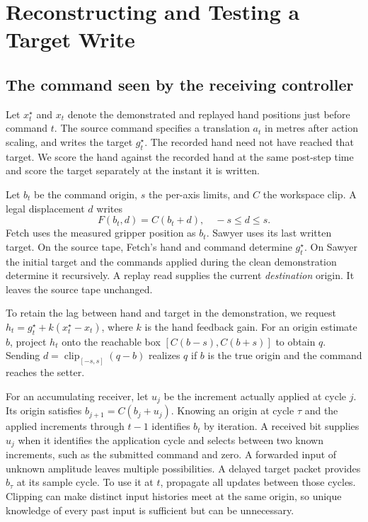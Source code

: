 \section{Reconstructing and Testing a Target Write}
\subsection{The command seen by the receiving controller}
Let $x_t^\star$ and $x_t$ denote the demonstrated and replayed hand positions just before command $t$. The source command specifies a translation $a_t$ in metres after action scaling, and writes the target $g_t^\star$. The recorded hand need not have reached that target. We score the hand against the recorded hand at the same post-step time and score the target separately at the instant it is written.

Let $b_t$ be the command origin, $s$ the per-axis limits, and $C$ the workspace clip. A legal displacement $d$ writes
\begin{equation}
 F(b_t,d)=C(b_t+d),\quad -s\le d\le s .\label{eq:setter}
\end{equation}
Fetch uses the measured gripper position as $b_t$. Sawyer uses its last written target. On the source tape, Fetch's hand and command determine $g_t^\star$. On Sawyer the initial target and the commands applied during the clean demonstration determine it recursively. A replay read supplies the current \emph{destination} origin. It leaves the source tape unchanged.

To retain the lag between hand and target in the demonstration, we request $h_t=g_t^\star+k(x_t^\star-x_t)$, where $k$ is the hand feedback gain. For an origin estimate $b$, project $h_t$ onto the reachable box $[C(b-s),C(b+s)]$ to obtain $q$. Sending $d=\operatorname{clip}_{[-s,s]}(q-b)$ realizes $q$ if $b$ is the true origin and the command reaches the setter.

For an accumulating receiver, let $u_j$ be the increment actually applied at cycle $j$. Its origin satisfies $b_{j+1}=C(b_j+u_j)$. Knowing an origin at cycle $\tau$ and the applied increments through $t-1$ identifies $b_t$ by iteration. A received bit supplies $u_j$ when it identifies the application cycle and selects between two known increments, such as the submitted command and zero. A forwarded input of unknown amplitude leaves multiple possibilities. A delayed target packet provides $b_\tau$ at its sample cycle. To use it at $t$, propagate all updates between those cycles. Clipping can make distinct input histories meet at the same origin, so unique knowledge of every past input is sufficient but can be unnecessary.

